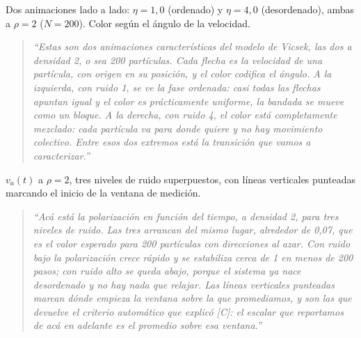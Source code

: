 \documentclass[11pt]{article}
\begin{document}

Dos animaciones lado a lado: $\eta = 1{,}0$ (ordenado) y $\eta = 4{,}0$
(desordenado), ambas a $\rho = 2$ ($N = 200$). Color según el ángulo de la
velocidad.

\begin{quote}
\itshape
``Estas son dos animaciones características del modelo de Vicsek, las dos a
densidad 2, o sea 200 partículas. Cada flecha es la velocidad de una partícula,
con origen en su posición, y el color codifica el ángulo. A la izquierda, con
ruido 1, se ve la fase ordenada: casi todas las flechas apuntan igual y el color
es prácticamente uniforme, la bandada se mueve como un bloque. A la derecha, con
ruido 4, el color está completamente mezclado: cada partícula va para donde
quiere y no hay movimiento colectivo. Entre esos dos extremos está la transición
que vamos a caracterizar.''
\end{quote}



$v_a(t)$ a $\rho = 2$, tres niveles de ruido superpuestos, con líneas verticales
punteadas marcando el inicio de la ventana de medición.

\begin{quote}
\itshape
``Acá está la polarización en función del tiempo, a densidad 2, para tres
niveles de ruido. Las tres arrancan del mismo lugar, alrededor de 0,07, que es
el valor esperado para 200 partículas con direcciones al azar. Con ruido bajo la
polarización crece rápido y se estabiliza cerca de 1 en menos de 200 pasos; con
ruido alto se queda abajo, porque el sistema ya nace desordenado y no hay nada
que relajar. Las líneas verticales punteadas marcan dónde empieza la ventana
sobre la que promediamos, y son las que devuelve el criterio automático que
explicó [C]: el escalar que reportamos de acá en adelante es el promedio sobre
esa ventana.''
\end{quote}


\end{document}
